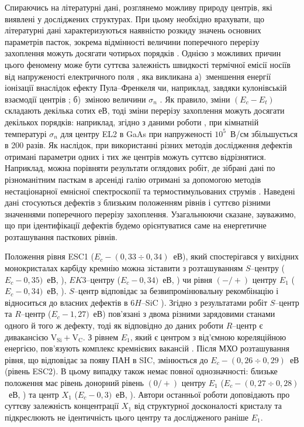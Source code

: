 \documentclass[a4paper,14pt,oneside,openany]{memoir}
\begin{document}
Спираючись на літературні дані, розглянемо можливу природу центрів,
які виявлені у досліджених структурах.
При цьому необхідно врахувати, що літературні дані характеризуються наявністю розкиду значень основних параметрів
пасток, зокрема відмінності величини поперечного перерізу захоплення можуть досягати чотирьох порядків \cite{Pavlovic2000}.
Однією з можливих причин цього феномену може бути суттєва залежність швидкості термічної емісії носіїв від 
напруженості електричного поля  \cite{Bulyarskii2000r,Makram,Shishiyanu},
яка викликана
а)~зменшення енергії іонізації внаслідок ефекту Пула--Френкеля чи, наприклад,
завдяки кулонівській взаємодії центрів \cite{Stellmacher};
б)~зміною величини $\sigma_n$ \cite{Shishiyanu,Bourgoin2001}.
Як правило, зміни $(E_c-E_t)$ складають декілька сотих еВ, тоді 
зміни перерізу захоплення можуть досягати декількох порядків:
наприклад, згідно з даними роботи \cite{Bourgoin2001},  при кімнатній температурі $\sigma_n$ для центру EL2 в GaAs при напруженості $10^5$~В/см збільшується в 200 разів.
Як наслідок, при використанні різних методів дослідження дефектів отримані параметри одних і тих же центрів
можуть суттєво відрізнятися.
Наприклад, можна порівняти результати оглядових робіт, де зібрані дані по різноманітним пасткам в арсеніді галію отримані за допомогою методів нестаціонарної емнісної спектроскопії \cite{Bourgoin:GaAs} та 
термостимульованих струмів \cite{Pavlovic2000}.
Наведені дані стосуються дефектів з близьким положенням рівнів і суттєво різними значеннями поперечного перерізу захоплення.
Узагальнюючи сказане, зауважимо, що при ідентифікації дефектів будемо орієнтуватися саме на енергетичне розташування
пасткових рівнів.


Положення рівня ESC1 ($E_c-(0,33\div0,34)$~еВ), який спостерігався у вихідних монокристалах карбіду кремнію
можна зіставити з розташуванням $S$--центру ($E_c-0,35)$~еВ, \cite{Lebed1999,Anikin1991:2,Anikin1991:3}),
$EK3$--центру ($E_c-0,34)$~еВ, \cite{Kuznets1997}) чи рівня $(-/+)$ центру $E_1$ ($E_c-0,34)$~еВ, \cite{Lebed1999}).
$S$--центр відповідає за безвипромінювальну рекомбінацію і відноситься до власних дефектів в 6$H$--SiC \cite{Lebed1999}).
Згідно з результатами робіт \cite{Anikin1991:2,Anikin1991:3} $S$--центр та $R$--центр ($E_c-1,27)$~еВ) пов'язані
з двома різними зарядовими станами одного й того ж дефекту, тоді як відповідно до даних роботи \cite{Lebedev2000}
$R$--центр є дивакансією V$_\text{Si}+$V$_\text{C}$.
З рівнем $E_1$, який є центром з від'ємною кореляційною енергією,
пов'язують комплекс кремнієвих вакансій  \cite{Lebedev2001}.
Після МХО розташування рівня, що відповідає за появу ПАН в SIC, змінюється до $E_c-(0,26\div0,29)$~еВ (рівень ESC2).
В цьому випадку також немає повної однозначності:
близьке положення має рівень донорний рівень $(0/+)$ центру $E_1$ ($E_c-(0,27\div0,28)$~еВ, \cite{Hemmingsson})
та центр $X_1$ ($E_c-0,3)$~еВ, \cite{Lebedev2001}).
Автори останньої роботи доповідають про суттєву залежність концентрації $X_1$ від структурної
досконалості кристалу та підкреслюють не ідентичність цього центру  та  дослідженого раніше $E_1$.
\end{document}
